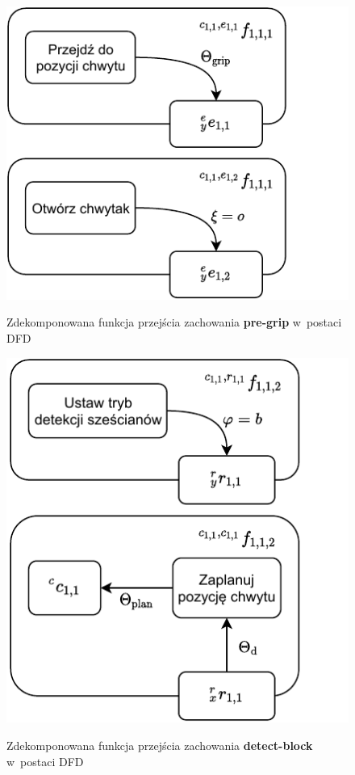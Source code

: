 \begin{figure}
    \centering
    \includegraphics[width=\columnwidth]{figures/ISR-cs-fp-pre-grip.pdf}
    \label{fig:cs-fp-pre-grip}
    \caption{Zdekomponowana funkcja przejścia zachowania \textbf{pre-grip} w~postaci DFD}
\end{figure}

\begin{figure}
    \centering
    \includegraphics[width=\columnwidth]{figures/ISR-cs-fp-detect-block.pdf}
    \label{fig:cs-fp-detect-block}
    \caption{Zdekomponowana funkcja przejścia zachowania \textbf{detect-block} w~postaci DFD}
\end{figure}


